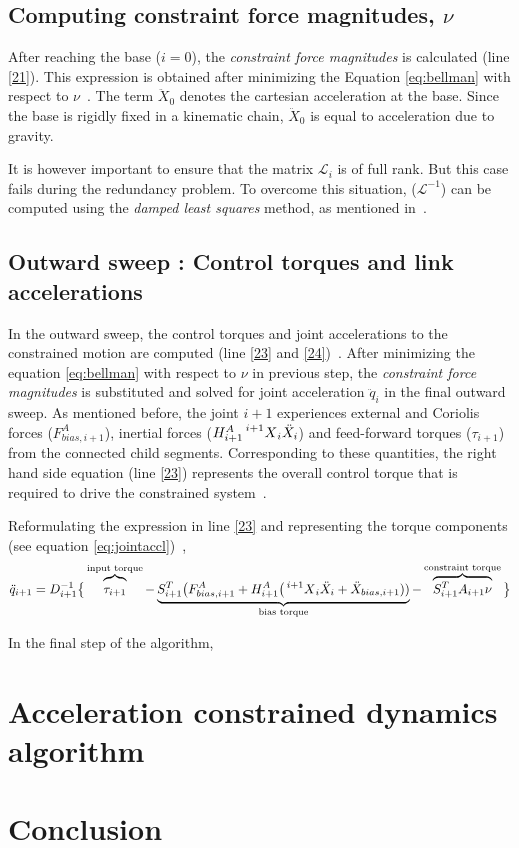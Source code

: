 \subsection{Computing constraint force magnitudes, $\nu$}

After reaching the base ($i = 0$), the \textit{constraint force magnitudes} is calculated (line \ref{21}). This expression is obtained after minimizing the Equation \ref{eq:bellman} with respect to $\nu$~\cite{shakhimardanov2015composable}. The term $\ddot{X}_0$ denotes the cartesian acceleration at the base. Since the base is rigidly fixed in a kinematic chain, $\ddot{X}_0$ is equal to acceleration due to gravity. 

It is however important to ensure that the matrix $\mathcal{L}_i$ is of full rank. But this case fails during the redundancy problem. To overcome this situation, ($\mathcal{L}^{-1}$) can be computed using the \textit{damped least squares} method, as mentioned in~\cite{shakhimardanov2015composable}.

\subsection{Outward sweep : Control torques and link accelerations}
In the outward sweep, the control torques and joint accelerations to the constrained motion are computed (line \ref{23} and \ref{24})~\cite{shakhimardanov2015composable}. After minimizing the equation \ref{eq:bellman} with respect to $\nu$ in previous step, the \textit{constraint force magnitudes} is substituted and solved for joint acceleration $\ddot{q}_i$ in the final outward sweep. As mentioned before, the joint $i+1$ experiences external and Coriolis forces ($F_{bias, i+1}^A$), inertial forces ($H_{i+1}^A\prescript{i+1}{}{X}_i \ddot{X}_i$) and feed-forward torques ($\tau_{i+1}$) from the connected child segments. Corresponding to these quantities, the right hand side equation (line \ref{23}) represents the overall control torque that is required to drive the constrained system~\cite{vukcevic2018extending}.

Reformulating the expression in line \ref{23} and representing the torque components (see equation \ref{eq:jointaccl})~\cite{vukcevic2018extending},
\begin{equation}\label{eq:jointaccl}
	\ddot{q}_{i+1} = D_{i+1}^{-1} \big\{ \overbrace{\strut \tau_{i+1}}^\text{input torque} - \underbrace{ \strut S_{i+1}^T \big(F_{bias, i+1}^A + H_{i+1}^A \big(\prescript{i+1}{}{X}_i \ddot{X}_i + \ddot{X}_{bias, i+1}))}_\text{bias torque} - \overbrace{\strut S_{i+1}^T A_{i+1} \nu}^\text{constraint torque} \big \}
\end{equation}

In the final step of the algorithm, 

\section{Acceleration constrained dynamics algorithm}

\section{Conclusion}


